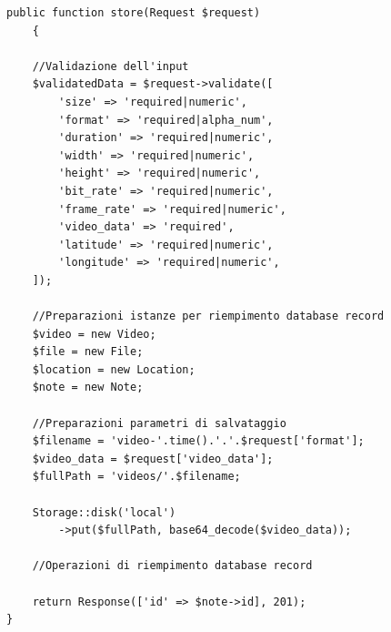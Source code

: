 \pagebreak
\begin{lstlisting}[caption={Esempio di salvataggio di un file video}, label={lst:storeVideo}]
public function store(Request $request)
	{
	
	//Validazione dell'input
	$validatedData = $request->validate([
		'size' => 'required|numeric',
		'format' => 'required|alpha_num',
		'duration' => 'required|numeric',
		'width' => 'required|numeric',
		'height' => 'required|numeric',
		'bit_rate' => 'required|numeric',
		'frame_rate' => 'required|numeric',
		'video_data' => 'required',
		'latitude' => 'required|numeric',
		'longitude' => 'required|numeric',
	]);
	
	//Preparazioni istanze per riempimento database record
	$video = new Video;
	$file = new File;
	$location = new Location;
	$note = new Note;
	
	//Preparazioni parametri di salvataggio
	$filename = 'video-'.time().'.'.$request['format'];
	$video_data = $request['video_data'];
	$fullPath = 'videos/'.$filename;
	
	Storage::disk('local')
		->put($fullPath, base64_decode($video_data));
	
	//Operazioni di riempimento database record
	
	return Response(['id' => $note->id], 201);
}
\end{lstlisting}


